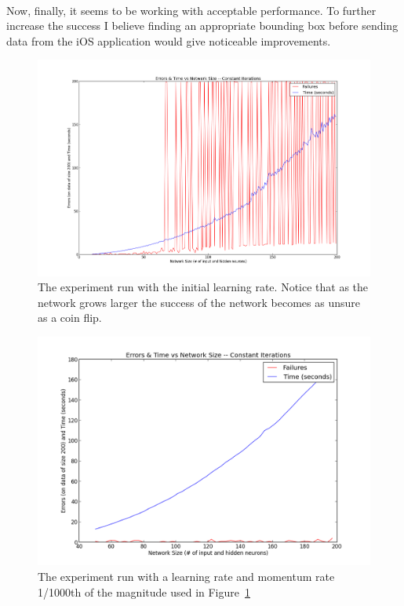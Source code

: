 \documentclass{article}
\begin{document}
    \paragraph{}Now, finally, it seems to be working with acceptable
    performance. To further increase the success I believe finding an 
    appropriate bounding box before sending data from the iOS 
    application would give noticeable improvements.

    \begin{figure}
        \centering
        \includegraphics[scale=0.4]{images/bad_learning.png}
        \caption{The experiment run with the initial learning rate. Notice that
            as the network grows larger the success of the network becomes as
            unsure as a coin flip.}
        \label{badgraph}
    \end{figure}

    \begin{figure}
        \centering
        \includegraphics[scale=0.5]{images/good_learning.png}
        \caption{The experiment run with a learning rate and momentum rate 
            1/1000th of the magnitude used in Figure~\ref{badgraph}}
        \label{goodgraph}
    \end{figure}
\end{document}

